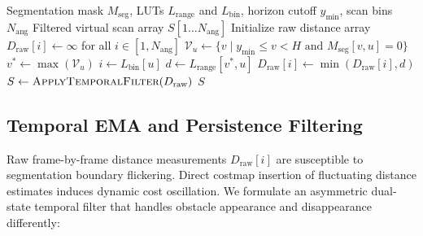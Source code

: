 \documentclass[preprint,12pt]{elsarticle}
\begin{document}
\begin{algorithm}[t]
\caption{Virtual LaserScan Generation}
\label{alg:virtual_scan}
\begin{algorithmic}[1]
\Require Segmentation mask $M_{\mathrm{seg}}$, LUTs $L_{\mathrm{range}}$ and $L_{\mathrm{bin}}$, horizon cutoff $y_{\min}$, scan bins $N_{\mathrm{ang}}$
\Ensure Filtered virtual scan array $S[1 \dots N_{\mathrm{ang}}]$
\State Initialize raw distance array $D_{\mathrm{raw}}[i] \gets \infty$ for all $i \in [1, N_{\mathrm{ang}}]$
    \State $\mathcal{V}_u \gets \{v \mid y_{\min} \le v < H \text{ and } M_{\mathrm{seg}}[v, u] = 0\}$
        \State $v^* \gets \max(\mathcal{V}_u)$ 
        \State $i \gets L_{\mathrm{bin}}[u]$
        \State $d \gets L_{\mathrm{range}}[v^*, u]$
        \State $D_{\mathrm{raw}}[i] \gets \min(D_{\mathrm{raw}}[i], d)$
    \EndIf
\EndFor
\State $S \gets \textsc{ApplyTemporalFilter}(D_{\mathrm{raw}})$
\State \Return $S$
\end{algorithmic}
\end{algorithm}

\subsection{Temporal EMA and Persistence Filtering}
\label{subsec:temporal_filter}
Raw frame-by-frame distance measurements $D_{\mathrm{raw}}[i]$ are susceptible to segmentation boundary flickering. Direct costmap insertion of fluctuating distance estimates induces dynamic cost oscillation. We formulate an asymmetric dual-state temporal filter that handles obstacle appearance and disappearance differently:
\end{document}

